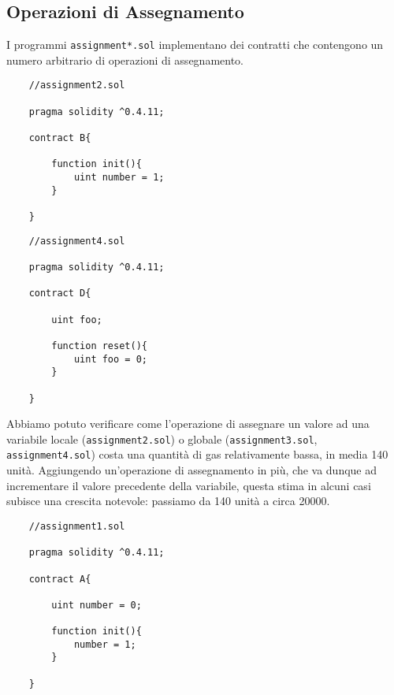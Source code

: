     \subsection{Operazioni di Assegnamento}
    
    I programmi \verb|assignment*.sol| implementano dei contratti che contengono un numero arbitrario di operazioni di assegnamento.
    
    \noindent
    \begin{minipage}[t]{.5\linewidth}
    \begin{lstlisting}
    //assignment2.sol
        
    pragma solidity ^0.4.11;

    contract B{

        function init(){
            uint number = 1;    
        }

    }

    \end{lstlisting}
    \end{minipage}
    \begin{minipage}[t]{.5\linewidth}
    \begin{lstlisting}
    //assignment4.sol

    pragma solidity ^0.4.11;

    contract D{

        uint foo;

        function reset(){
            uint foo = 0;    
        }

    }
    \end{lstlisting}
    \end{minipage}

    Abbiamo potuto verificare come l'operazione di assegnare un valore ad una variabile locale (\verb|assignment2.sol|) o globale (\verb|assignment3.sol|, \verb|assignment4.sol|) costa una quantità di gas relativamente bassa, in media 140 unità.
    Aggiungendo un'operazione di assegnamento in più, che va dunque ad incrementare il valore precedente della variabile, questa stima in alcuni casi subisce una crescita notevole: passiamo da 140 unità a circa 20000.
    
    \begin{center}
    \begin{minipage}{\linewidth}
    \begin{lstlisting}
    //assignment1.sol
        
    pragma solidity ^0.4.11;

    contract A{

        uint number = 0;

        function init(){
            number = 1;    
        }

    }
    \end{lstlisting} 
    \end{minipage}
    \end{center}

